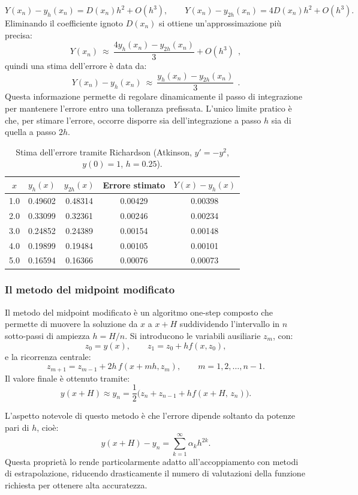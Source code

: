 \documentclass{article}
\begin{document}
	\[
	Y(x_n) - y_h(x_n) = D(x_n) h^2 + O(h^3),
	\qquad
	Y(x_n) - y_{2h}(x_n) = 4 D(x_n) h^2 + O(h^3).
	\]
	Eliminando il coefficiente ignoto $D(x_n)$ si ottiene un'approssimazione più precisa:
	\[
	Y(x_n)\ \approx \ \frac{4 y_h(x_n) - y_{2h}(x_n)}{3} + O(h^3)\ \ ,
	\]
	quindi una stima dell'errore è data da:
	\[
	Y(x_n) - y_h(x_n)\  \approx \ 
	\frac{y_h(x_n) - y_{2h}(x_n)}{3} \ \ .
	\]
	Questa informazione permette di regolare dinamicamente il passo di integrazione
	per mantenere l'errore entro una tolleranza prefissata. 
	L'unico limite pratico è che, per stimare l'errore, occorre disporre sia
	dell'integrazione a passo $h$ sia di quella a passo $2h$.
	
	\begin{table}[H]
		\centering
		\begin{tabular}{c|c|c|c|c}
			\hline
			$x$ & $y_h(x)$ & $y_{2h}(x)$ & Errore stimato & $Y(x)-y_h(x)$ \\
			\hline
			1.0 & 0.49602 & 0.48314 & 0.00429 & 0.00398 \\
			2.0 & 0.33099 & 0.32361 & 0.00246 & 0.00234 \\
			3.0 & 0.24852 & 0.24389 & 0.00154 & 0.00148 \\
			4.0 & 0.19899 & 0.19484 & 0.00105 & 0.00101 \\
			5.0 & 0.16594 & 0.16366 & 0.00076 & 0.00073 \\
			\hline
		\end{tabular}
		\caption{Stima dell'errore tramite Richardson (Atkinson, $y'=-y^2$, $y(0)=1$, $h=0.25$).}
	\end{table}
	
	
	
	\subsubsection{Il metodo del midpoint modificato}
	
	Il metodo del midpoint modificato è un algoritmo one-step composto che
	permette di muovere la soluzione da $x$ a $x+H$ suddividendo l'intervallo in
	$n$ sotto-passi di ampiezza $h = H/n$.  
	Si introducono le variabili ausiliarie $z_m$, con:
	\[
	z_0 = y(x), \qquad
	z_1 = z_0 + h f(x, z_0),
	\]
	e la ricorrenza centrale:
	\[
	z_{m+1} = z_{m-1} + 2h\, f(x + m h, z_m),
	\qquad m = 1,2,\dots,n-1.
	\]
	Il valore finale è ottenuto tramite:
	\[
	y(x+H) \approx y_n =
	\frac{1}{2}\bigl(z_n + z_{n-1} + h f(x+H,\, z_n)\bigr).
	\]
	
	L'aspetto notevole di questo metodo è che l'errore dipende soltanto da potenze
	pari di $h$, cioè:
	\[
	y(x+H) - y_n = \sum_{k=1}^{\infty} \alpha_k h^{2k}.
	\]
	Questa proprietà lo rende particolarmente adatto all'accoppiamento con metodi
	di estrapolazione, riducendo drasticamente il numero di valutazioni della
	funzione richiesta per ottenere alta accuratezza.
	
\end{document}
